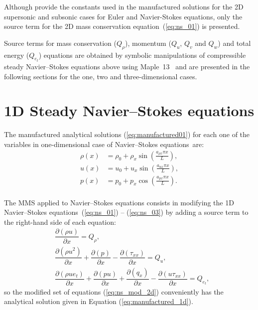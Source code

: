 \documentclass[10pt]{article}
\newcommand{\Diff}[2] {\dfrac{\partial( #1)}{\partial #2}}
\begin{document}
Although \citet{Roy2002} provide the constants used in the manufactured solutions for the 2D supersonic and subsonic cases for Euler and Navier-Stokes equations, only the source term for the 2D mass conservation equation~(\ref{eq:ns_01}) is presented.


Source terms  for mass conservation ($Q_\rho$), momentum ($Q_u$, $Q_v$ and $Q_w$)  and total energy ($Q_{e_t}$) equations are obtained by symbolic manipulations of compressible steady Navier--Stokes equations above using Maple~13~\citep{Maple} and are presented in the following sections for the one, two and three-dimensional cases.


\section{1D Steady Navier--Stokes equations}

The manufactured analytical solutions (\ref{eq:manufactured01}) for each one of the variables in one-dimensional case of Navier--Stokes equations~are:
\begin{equation}
\begin{split}
\label{eq:manufactured_1d}
\rho\left(x\right) &=  \rho_{0}+ \rho_{x} \sin\left(\frac{a_{ \rho x} \pi x}{L}\right),\\
u\left(x\right) &= u_{0}+u_{x} \sin\left(\frac{a_{u x} \pi x}{L}\right),\\
p\left(x\right) &= p_{0}+p_{x} \cos\left(\frac{a_{p x} \pi x}{L}\right).\\
\end{split}
\end{equation}


The MMS applied to Navier--Stokes equations consists in modifying the 1D Navier--Stokes equations~(\ref{eq:ns_01}) -- (\ref{eq:ns_03}) by adding a source term to the right-hand side of each equation:
\begin{equation}
 \label{eq:ns_mod_2d}
\begin{split}
&\Diff{\rho u}{x} = Q_\rho,\\
&\Diff{\rho u^2 }{x}+ \Diff{p}{x} -\Diff{\tau_{xx}}{x}= Q_u,\\
&\Diff{\rho ue_t}{x}+ \Diff{pu}{x}+ \Diff{q_x}{x}-\Diff{u\tau_{xx}}{x} = Q_{e_t},
\end{split}
\end{equation}
%
so the modified set of equations (\ref{eq:ns_mod_2d}) conveniently has the analytical solution given in Equation (\ref{eq:manufactured_1d}).
%
\end{document}
